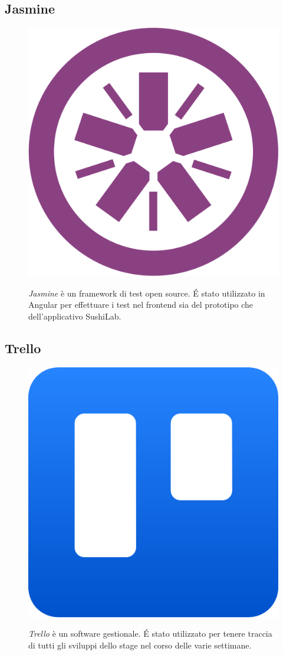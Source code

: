 \subsection*{Jasmine}
\FloatBarrier
\begin{figure}[!h]
  \begin{minipage}[h]{0.3\linewidth}
    \centering
    \includegraphics[width=0.4\linewidth]{immagini/jasmine.png}
  \end{minipage}
  \begin{minipage}[!h]{0.7\linewidth}
    \textit{Jasmine} è un framework di test open source. É stato utilizzato in Angular per effettuare i test nel frontend sia del prototipo che dell'applicativo SushiLab.
  \end{minipage}
\end{figure}
\FloatBarrier
\subsection*{Trello}
\FloatBarrier
\begin{figure}[!h]
  \begin{minipage}[h]{0.3\linewidth}
    \centering
    \includegraphics[width=0.35\linewidth]{immagini/trello.png}
  \end{minipage}
  \begin{minipage}[!h]{0.7\linewidth}
    \textit{Trello} è un software gestionale. É stato utilizzato per tenere traccia di tutti gli sviluppi dello stage nel corso delle varie settimane.
  \end{minipage}
\end{figure}
\FloatBarrier

